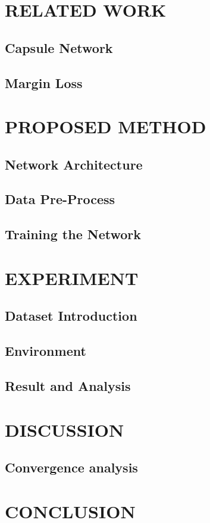 \documentclass{article}
\begin{document}
	\section{RELATED WORK}\label{sec:related-works}

	\subsection{Capsule Network}\label{subsec:capsule-network}

	\subsection{Margin Loss}\label{subsec:margin-loss}


	\section{PROPOSED METHOD}\label{sec:proposed-method}

	\subsection{Network Architecture}\label{subsec:network-architecture}

	\subsection{Data Pre-Process}\label{subsec:data-pre-process}

	\subsection{Training the Network}\label{subsec:training-the-network}


	\section{EXPERIMENT}\label{sec:experiment}

	\subsection{Dataset Introduction}\label{subsec:dataset-introduction}

	\subsection{Environment}\label{subsec:environment}

	\subsection{Result and Analysis}\label{subsec:result-and-analysis}


	\section{DISCUSSION}\label{sec:discussion}

	\subsection{Convergence analysis}\label{subsec:convergence}



	\section{CONCLUSION}\label{sec:conclusion}
\end{document}
